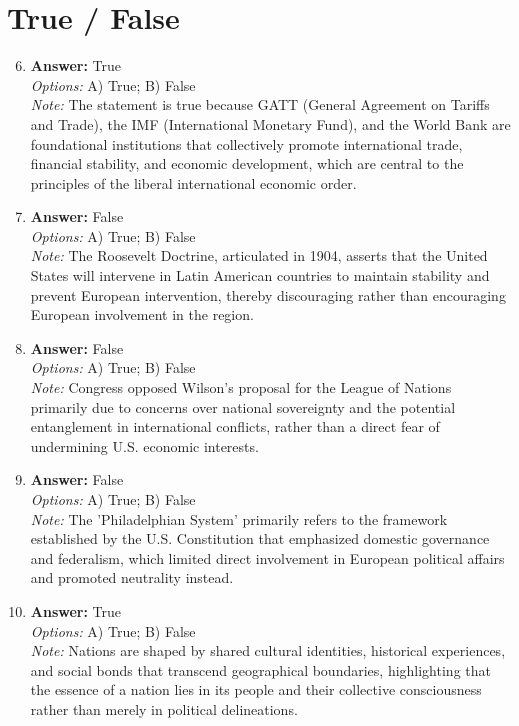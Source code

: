 \documentclass[12pt]{article}
\begin{document}
\section*{True / False}
\begin{enumerate}[label=\arabic*.]
\setcounter{enumi}{5}
\item \textbf{Answer:} True
\\ \textit{Options:} A) True; B) False
\\ \textit{Note:} The statement is true because GATT (General Agreement on Tariffs and Trade), the IMF (International Monetary Fund), and the World Bank are foundational institutions that collectively promote international trade, financial stability, and economic development, which are central to the principles of the liberal international economic order.
\item \textbf{Answer:} False
\\ \textit{Options:} A) True; B) False
\\ \textit{Note:} The Roosevelt Doctrine, articulated in 1904, asserts that the United States will intervene in Latin American countries to maintain stability and prevent European intervention, thereby discouraging rather than encouraging European involvement in the region.
\item \textbf{Answer:} False
\\ \textit{Options:} A) True; B) False
\\ \textit{Note:} Congress opposed Wilson's proposal for the League of Nations primarily due to concerns over national sovereignty and the potential entanglement in international conflicts, rather than a direct fear of undermining U.S. economic interests.
\item \textbf{Answer:} False
\\ \textit{Options:} A) True; B) False
\\ \textit{Note:} The 'Philadelphian System' primarily refers to the framework established by the U.S. Constitution that emphasized domestic governance and federalism, which limited direct involvement in European political affairs and promoted neutrality instead.
\item \textbf{Answer:} True
\\ \textit{Options:} A) True; B) False
\\ \textit{Note:} Nations are shaped by shared cultural identities, historical experiences, and social bonds that transcend geographical boundaries, highlighting that the essence of a nation lies in its people and their collective consciousness rather than merely in political delineations.
\end{enumerate}
\end{document}
